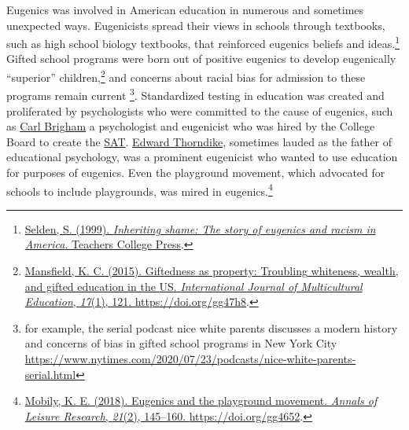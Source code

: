 \documentclass[
  oneside,
  12pt]{crumpbook}
\begin{document}
Eugenics was involved in American education in numerous and sometimes unexpected ways. Eugenicists spread their views in schools through textbooks, such as high school biology textbooks, that reinforced eugenics beliefs and ideas.\footnote{\protect\hyperlink{ref-seldenInheritingShameStory1999}{Selden, S. (1999). \emph{Inheriting shame: {The} story of eugenics and racism in {America}}. {Teachers College Press}}.} Gifted school programs were born out of positive eugenics to develop eugenically ``superior'' children,\footnote{\protect\hyperlink{ref-mansfieldGiftednessPropertyTroubling2015}{Mansfield, K. C. (2015). Giftedness as property: {Troubling} whiteness, wealth, and gifted education in the {US}. \emph{International Journal of Multicultural Education}, \emph{17}(1), 121. \url{https://doi.org/gg47h8}}.} and concerns about racial bias for admission to these programs remain current \footnote{for example, the serial podcast nice white parents discusses a modern history and concerns of bias in gifted school programs in New York City \url{https://www.nytimes.com/2020/07/23/podcasts/nice-white-parents-serial.html}}. Standardized testing in education was created and proliferated by psychologists who were committed to the cause of eugenics, such as \href{https://en.wikipedia.org/wiki/Carl_Brigham}{Carl Brigham} a psychologist and eugenicist who was hired by the College Board to create the \href{https://en.wikipedia.org/wiki/SAT}{SAT}. \href{https://en.wikipedia.org/wiki/Edward_Thorndike}{Edward Thorndike}, sometimes lauded as the father of educational psychology, was a prominent eugenicist who wanted to use education for purposes of eugenics. Even the playground movement, which advocated for schools to include playgrounds, was mired in eugenics.\footnote{\protect\hyperlink{ref-mobilyEugenicsPlaygroundMovement2018}{Mobily, K. E. (2018). Eugenics and the playground movement. \emph{Annals of Leisure Research}, \emph{21}(2), 145--160. \url{https://doi.org/gg4652}}.}
\end{document}
